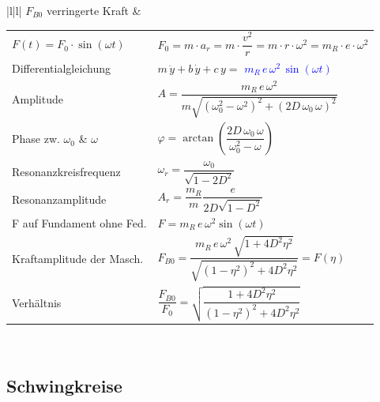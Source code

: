 \begin{tabular}{|l|l|}
{	$F_{B0}$ verringerte Kraft}
	& \begin{minipage}[]{12cm}
      \renewcommand{\arraystretch}{2}
		\begin{tabular}{ll}
        $F(t)=F_0\cdot\sin(\omega t)$
        	& $F_0=m\cdot a_r=m\cdot\dfrac{v^2}{r}=m\cdot r\cdot \omega^2=m_R\cdot e \cdot \omega^2$ \\
    	Differentialgleichung
    		& $m\,\ddot{y}+b\,\dot{y}+c\,y=$
    		\textcolor{blue}{$m_R\,e\,\omega^2\,\sin(\omega t)$} \\
    	Amplitude
    		&
    		$A=\dfrac{m_R\,e\,\omega^2}{m\sqrt{(\omega_0^2-\omega^2)^2+(2D\,\omega_0\,\omega)^2}}$ \\
    	Phase zw. $\omega_0$ \& $\omega$
    		&
    		$\varphi=\operatorname{arctan}\left(\dfrac{2D\,\omega_0\,\omega}{\omega_0^2-\omega}\right)$\\ 
    	Resonanzkreisfrequenz
    		& $\omega_r=\dfrac{\omega_0}{\sqrt{1-2D^2}}$\\
    	Resonanzamplitude
    		& $A_r=\dfrac{m_R}{m}\dfrac{e}{2D\sqrt{1-D^2}}$\\
    	F auf Fundament ohne Fed.
    		& $F = m_R\,e\,\omega^2 \sin(\omega t)$\\
		Kraftamplitude der Masch.
    		&
    		$F_{B0}=\dfrac{m_R\,e\,\omega^2\,\sqrt{1+4D^2\eta^2}}{\sqrt{(1-\eta^2)^2+4D^2\eta^2}}=F(\eta)$ \\ 
    	Verhältnis
    		&$\dfrac{F_{B0}}{F_0}=\sqrt{\dfrac{1+4D^2\eta^2}{(1-\eta^2)^2+4D^2\eta^2}}$ \\ 
		\end{tabular}
    \end{minipage} \\
\hline
\end{tabular}
\renewcommand{\arraystretch}{1}

\newpage

\subsection{Schwingkreise}
